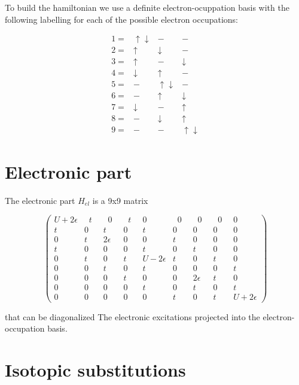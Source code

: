 To build the hamiltonian we use a definite electron-ocuppation basis with the following labelling for each of the possible electron occupations:

\begin{equation}\label{eq:basis-set}\begin{array}{cccc}
1= & \uparrow \downarrow & - & - \\
2= & \uparrow & \downarrow & - \\
3= & \uparrow & - & \downarrow \\
4= & \downarrow & \uparrow & - \\
5= & - & \uparrow \downarrow & - \\
6= & - & \uparrow & \downarrow \\
7= & \downarrow & - & \uparrow \\
8= & - & \downarrow & \uparrow \\
9= & - & - & \uparrow \downarrow \end{array}\end{equation}


\section{Electronic part}

The electronic part $H_{el}$ is a 9x9 matrix

\begin{equation}\label{eq:electronic-matrix}
\left( \begin{array}{ccccccccc} 
U+2\epsilon &\;\;t\;\;&\;\;0\;\;&\;\;t\;\;&0&\;\;0\;\;&\;\;0\;\;&\;\;0\;\;&0 \\
t&0&t&0&t&0&0&0&0 \\
0&t&2\epsilon &0&0&t&0&0&0 \\
t&0&0&0&t&0&t&0&0 \\
0&t&0&t&U-2\epsilon &t&0&t&0 \\
0&0&t&0&t&0&0&0&t \\
0&0&0&t&0&0&2\epsilon &t&0 \\
0&0&0&0&t&0&t&0&t \\
0&0&0&0&0&t&0&t&U+2\epsilon  \end{array} \right)\end{equation}

that can be diagonalized The electronic excitations projected into the electron-occupation basis.


\section{Isotopic substitutions}
\label{sec:isotopic-model}

